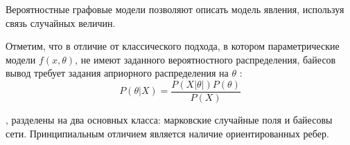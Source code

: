 Вероятностные графовые модели позволяют описать модель явления, используя связь случайных величин.


Отметим, что в отличие от классического подхода, в котором параметрические модели $f(x,\theta)$, не имеют заданного
вероятностного распределения, байесов вывод требует задания априорного распределения на $\theta$ :
\begin{equation}
    P(\theta | X) = \frac{P(X| \theta|) P(\theta)}{P(X)}
\end{equation}

, разделены на два основных класса: марковские случайные поля и байесовы сети.
Принципиальным отличием является наличие ориентированных ребер.








